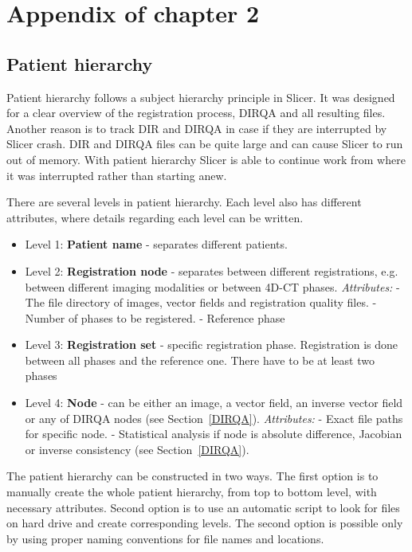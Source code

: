 \documentclass[type=dr, dr=rernat, accentcolor=tud7b,colorbacktitle, bigchapter, openright, twoside, 12pt ]{tudthesis}
\begin{document}
\chapter{Appendix of chapter 2}
\label{Appendix2}
\minitoc

\section{Patient hierarchy}
\label{PatHierarchy}

Patient hierarchy follows a subject hierarchy principle in Slicer. It was designed for a clear overview of the registration process, DIRQA and all resulting files. Another reason is to track DIR
and DIRQA in case if they are interrupted by Slicer crash. DIR and DIRQA files can be quite large and can cause Slicer to run out of memory. With patient hierarchy Slicer is able to continue work
from where it was interrupted rather than starting anew.

There are several levels in patient hierarchy. Each level also has different attributes, where details regarding each level can be written.

\begin{itemize}
	\item Level 1: \textbf{Patient name} - separates different patients.
	\item Level 2: \textbf{Registration node} - separates between different registrations, e.g. between different imaging modalities or between 4D-CT phases. 
	\subitem \textit{Attributes:}
	\subitem - The file directory of images, vector fields and registration quality files.
	\subitem - Number of phases to be registered.
	\subitem - Reference phase
	\item Level 3: \textbf{Registration set} - specific registration phase. Registration is done between all phases and the reference one. There have to be at least two phases
	\item Level 4: \textbf{Node} - can be either an image, a vector field, an inverse vector field or any of DIRQA nodes (see Section~\ref{DIRQA}).
	\subitem \textit{Attributes:}
	\subitem - Exact file paths for specific node.
	\subitem - Statistical analysis if node is absolute difference, Jacobian or inverse consistency (see Section~\ref{DIRQA}).
\end{itemize}

The patient hierarchy can be constructed in two ways. The first option is to manually create the whole patient hierarchy, from top to bottom level, with necessary attributes. Second option is to use an automatic script to look 
for files on hard drive and create corresponding levels. The second option is possible only by using proper naming conventions for file names and locations.
\end{document}
